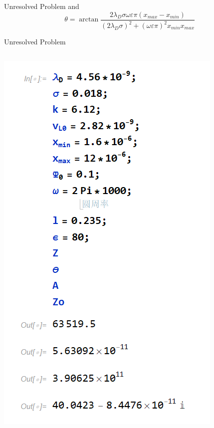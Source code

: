 \documentclass[12pt]{beamer}
\begin{document}
\begin{frame}{Unresolved Problem}
    and\\
    \[\theta=\arctan{\frac{2\lambda_D\sigma\omega\varepsilon\pi\left(x_{max}-x_{min}\right)}{\left(2\lambda_D\sigma\right)^2+(\omega\varepsilon\pi)^2x_{min}x_{max}}}\]
\end{frame}
\begin{frame}{Unresolved Problem}
    \begin{columns}[onlytextwidth]
        \begin{column}{0.35\textwidth}
            \includegraphics[width=\columnwidth]{5.png}

\end{column}
\end{columns}
\end{frame}
\end{document}
